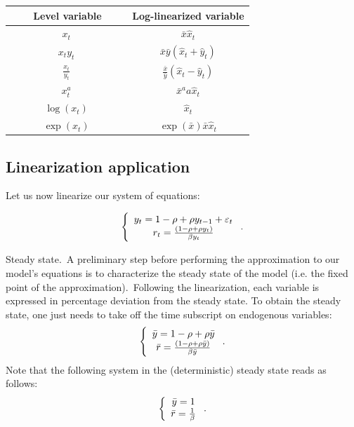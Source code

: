 \documentclass[a4paper,12pt]{article}%
\begin{document}
\begin{center}%
\begin{tabular}
[c]{ll}\hline\hline
\ \ \ \ \textbf{Level variable \ \ \ } & \textbf{Log-linearized variable}%
\\\hline
\multicolumn{1}{c}{$x_{t}$} & \multicolumn{1}{c}{$\bar{x}\hat{x}_{t}$}\\
\multicolumn{1}{c}{$x_{t}y_{t}$} & \multicolumn{1}{c}{$\bar{x}\bar{y}(\hat
{x}_{t}+\hat{y}_{t})$}\\
\multicolumn{1}{c}{$\frac{x_{t}}{y_{t}}$} & \multicolumn{1}{c}{$\frac{\bar{x}%
}{\bar{y}}(\hat{x}_{t}-\hat{y}_{t})$}\\
\multicolumn{1}{c}{$x_{t}^{a}$} & \multicolumn{1}{c}{$\bar{x}^{a}a\hat{x}_{t}%
$}\\
\multicolumn{1}{c}{$\log(x_{t})$} & \multicolumn{1}{c}{$\hat{x}_{t}$}\\
\multicolumn{1}{c}{$\exp(x_{t})$} & \multicolumn{1}{c}{$\exp(\bar{x})\bar
{x}\hat{x}_{t}$}\\\hline
\end{tabular}

\end{center}

\subsection{Linearization application}

Let us now linearize our system of equations:%

\begin{equation}
\left\{
\begin{array}
[c]{c}%
y_{t}=1-\rho+\rho y_{t-1}+\varepsilon_{t}\\
r_{t}=\frac{\left(  1-\rho+\rho y_{t}\right)  }{\beta y_{t}}%
\end{array}
\right.  .
\end{equation}


\textsf{Steady state.\ }A preliminary step before performing the approximation
to our model's equations is to characterize the steady state of the model
(i.e. the fixed point of the approximation).\ Following the linearization,
each variable is expressed in percentage deviation from the steady state. To
obtain the steady state, one just needs to take off the time subscript on
endogenous variables:%
\begin{equation}
\left\{
\begin{array}
[c]{c}%
\bar{y}=1-\rho+\rho\bar{y}\\
\bar{r}=\frac{\left(  1-\rho+\rho\bar{y}\right)  }{\beta\bar{y}}%
\end{array}
\right.  .
\end{equation}
Note that the following system in the (deterministic) steady state reads as
follows:%
\begin{equation}
\left\{
\begin{array}
[c]{c}%
\bar{y}=1\\
\bar{r}=\frac{1}{\beta}%
\end{array}
\right.  .
\end{equation}
\end{document}
